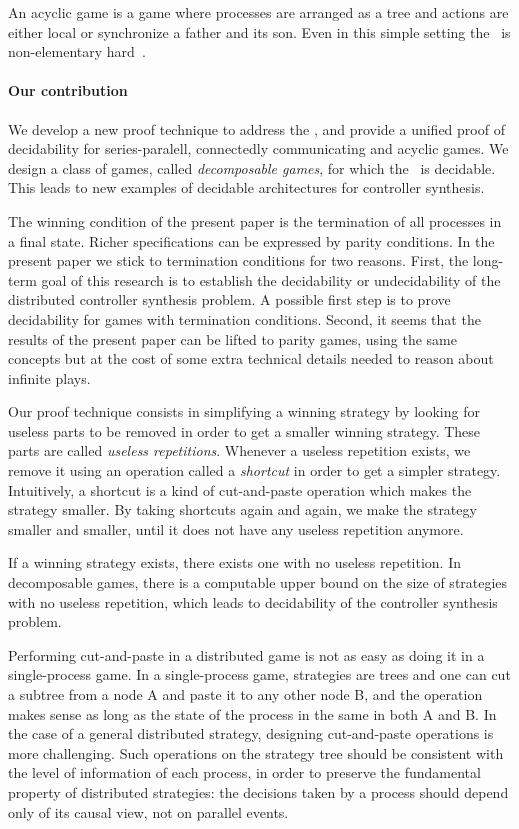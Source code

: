 \documentclass[a4paper,UKenglish]{lipics-v2016}
\begin{document}
An acyclic game is a game where processes are arranged as a tree and actions are either local or synchronize a father and its son.
Even in this simple setting the \dsp\ is non-elementary hard~\cite{acyclic}.



\paragraph*{Our contribution}
We develop a new proof technique to address the \dsp,
and provide a unified proof of decidability for series-paralell,
connectedly communicating and acyclic games.
We design a class of games, called \emph{decomposable games}, for which the \dsp\ is decidable.
This leads to new examples of decidable architectures for controller synthesis.


The winning  condition of the present paper is the termination of all processes in a final state.
Richer specifications can be expressed by parity conditions.
In the present paper we stick to termination conditions for two reasons.
First,
the long-term goal of this research is to establish the decidability or undecidability
of the distributed controller synthesis problem. A possible first step is to prove decidability
for games with termination conditions.
Second,
it seems that the results of the present paper can be lifted to parity games,
using the same concepts but at the cost of
some extra technical details
needed to reason about infinite plays.


Our proof technique consists in simplifying a winning strategy by looking for useless parts
to be removed in order to get a smaller winning strategy. These parts are called \emph{useless repetitions}. Whenever a useless repetition exists, we remove it using an operation called a \emph{shortcut} in order to get a simpler strategy. Intuitively, a shortcut is  a kind of cut-and-paste operation
which makes the strategy smaller. By taking shortcuts again and again, we make the strategy smaller and smaller, until it does not have any useless repetition anymore.

If a winning strategy exists, there exists one with no useless repetition. In decomposable games, there is a computable upper bound on the size of strategies with no useless repetition, which leads to decidability of the controller synthesis problem.




Performing cut-and-paste in a distributed game is not as easy as doing it in a single-process game.
In a single-process game,
strategies are trees and one can cut a subtree from a node A and paste it to any other node B, and the operation makes sense as long as the state of the process in the same in both  A and B.
In the case of a general distributed strategy,
designing  cut-and-paste operations is more challenging. Such operations on the strategy tree  should be consistent with the level of information of each process, in order to preserve the fundamental property of distributed strategies: the decisions taken by a process should depend only of its causal view,
not on parallel events.
\end{document}
